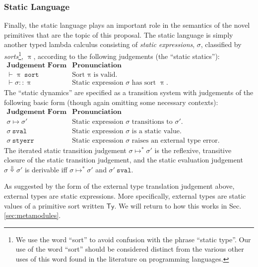 \subsubsection{Static Language}
Finally, the static language plays an important role in the semantics of the novel primitives that are the topic of this proposal. The static language is simply another typed lambda calculus consisting of \emph{static expressions}, $\sigma$, classified by \emph{sorts}\footnote{We use the word ``sort'' to avoid confusion with the phrase ``static type''. Our use of the  word ``sort'' should be considered distinct from the various other uses of this word found in the literature on programming languages.}, $\uppi$, according to the following judgements (the ``static statics''):
\\[1ex]
$
\begin{array}{ll}
\textbf{Judgement Form} & \textbf{Pronunciation}\\
\vdash \uppi~\mathtt{sort} & \text{Sort $\uppi$ is valid.}\\
\vdash \sigma :: \uppi & \text{Static expression $\sigma$ has sort $\uppi$.}
\end{array}
$\\

\noindent
The ``static dynamics'' are specified as a transition system with judgements of the following basic form (though again omitting some necessary contexts):
\\[1ex]
$
\begin{array}{ll}
\textbf{Judgement Form} & \textbf{Pronunciation}\\
\sigma \mapsto \sigma' & \text{Static expression $\sigma$ transitions to $\sigma'$.}\\
\sigma~\mathtt{sval} & \text{Static expression $\sigma$ is a static value.}\\
\sigma~\mathtt{styerr} & \text{Static expression $\sigma$ raises an external type error.}
\end{array}
$
\\[1ex]
The iterated static transition judgement $\sigma \mapsto^{*} \sigma'$ is the reflexive, transitive closure of the static transition judgement, and the static evaluation judgement $\sigma \Downarrow \sigma'$ is derivable iff $\sigma \mapsto^{*} \sigma'$ and $\sigma'~\mathtt{sval}$. 

As suggested by the form of the external type translation judgement above, external types are static expressions. More specifically, external types are static values of a primitive sort written $\mathsf{Ty}$. We will return to how this works in Sec. \ref{sec:metamodules}. 


